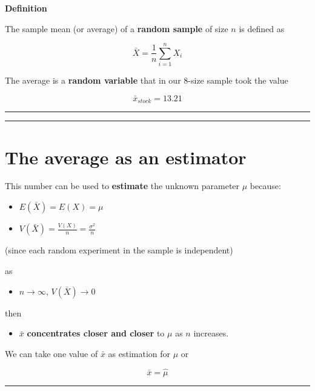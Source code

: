 \documentclass[
]{book}
\providecommand{\tightlist}{%
  \setlength{\itemsep}{0pt}\setlength{\parskip}{0pt}}
\begin{document}
\textbf{Definition}

The sample mean (or average) of a \textbf{random sample} of size \(n\) is defined as

\[\bar{X}=\frac{1}{n}\sum_{i=1}^n X_i\]

The average is a \textbf{random variable} that in our \(8\)-size sample took the value

\[\bar{x}_{stock}=13.21\]

\begin{center}\rule{0.5\linewidth}{0.5pt}\end{center}

\begin{center}\rule{0.5\linewidth}{0.5pt}\end{center}

\hypertarget{the-average-as-an-estimator}{%
\section{The average as an estimator}\label{the-average-as-an-estimator}}

This number can be used to \textbf{estimate} the unknown parameter \(\mu\) because:

\begin{itemize}
\tightlist
\item
  \(E(\bar{X})=E(X)=\mu\)
\item
  \(V(\bar{X})=\frac{V(X)}{n}=\frac{\sigma^2}{n}\)
\end{itemize}

(since each random experiment in the sample is independent)

as

\begin{itemize}
\tightlist
\item
  \(n \rightarrow \infty\), \(V(\bar{X}) \rightarrow 0\)
\end{itemize}

then

\begin{itemize}
\tightlist
\item
  \(\bar{x}\) \textbf{concentrates closer and closer} to \(\mu\) as \(n\) increases.
\end{itemize}

We can take one value of \(\bar{x}\) as estimation for \(\mu\) or

\[\bar{x}=\hat{\mu}\]

\begin{center}\rule{0.5\linewidth}{0.5pt}\end{center}
\end{document}
